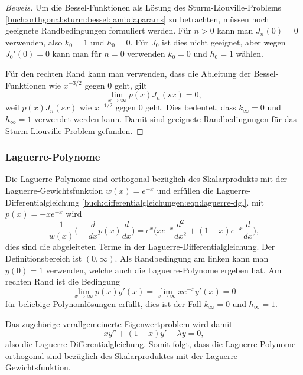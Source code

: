 \begin{proof}[Beweis]
Um die Bessel-Funktionen als Lösung des Sturm-Liouville-Problems
\eqref{buch:orthgonal:sturm:bessel:lambdaparams}
zu betrachten, müssen noch geeignete Randbedingungen formuliert werden.
Für $n>0$ kann man 
$J_n(0)=0$ verwenden, also $k_0=1$ und $h_0=0$.
Für $J_0$ ist dies nicht geeignet, aber wegen $J_0'(0)=0$ kann
man für $n=0$ verwenden $k_0=0$ und $h_0=1$ wählen.

Für den rechten Rand kann man verwenden, dass die Ableitung der
Bessel-Funktionen wie $x^{-3/2}$ gegen $0$ geht, gilt
\[
\lim_{x\to\infty} p(x) J_n(sx) = 0,
\]
weil $p(x)J_n(sx)$ wie $x^{-1/2}$ gegen $0$ geht.
Dies bedeutet, dass $k_\infty=0$ und $h_\infty=1$
verwendet werden kann.
Damit sind geeignete Randbedingungen für das Sturm-Liouville-Problem
gefunden.
\end{proof}

\subsubsection{Laguerre-Polynome}
Die Laguerre-Polynome sind orthogonal bezüglich des Skalarprodukts
mit der Laguerre-Gewichtsfunktion $w(x)=e^{-x}$ und erfüllen die
Laguerre-Differentialgleichung
\eqref{buch:differentialgleichungen:eqn:laguerre-dgl}.
mit $p(x)=-xe^{-x}$ wird 
\[
\frac{1}{w(x)}
\biggl(
-
\frac{d}{dx} p(x) \frac{d}{dx}
\biggr)
=
e^x \biggl(xe^{-x}\frac{d^2}{dx^2} + (1-x)e^{-x}\frac{d}{dx}\biggr),
\]
dies sind die abgeleiteten Terme in der Laguerre-Differentialgleichung.
Der Definitionsbereich ist $(0,\infty)$.
Als Randbedingung am linken kann man $y(0)=1$ verwenden, welche
auch die Laguerre-Polynome ergeben hat.
Am rechten Rand ist die Bedingung
\[
\lim_{x\to\infty} p(x)y'(x)
=
\lim_{x\to\infty} xe^{-x} y'(x)
=
0
\]
für beliebige Polynomlösungen erfüllt, dies ist der Fall
$k_{\infty}=0$ und $h_\infty=1$.

Das zugehörige verallgemeinerte Eigenwertproblem  wird damit
\[
xy'' + (1-x)y' - \lambda y = 0,
\]
also die Laguerre-Differentialgleichung.
Somit folgt, dass die Laguerre-Polynome orthogonal sind bezüglich
des Skalarproduktes mit der Laguerre-Gewichtsfunktion.


